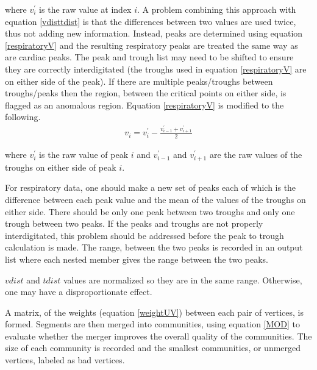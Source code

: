\documentclass[twoside,twocolumn]{article}
\begin{document}
where $v_i^{\prime}$ is the raw value at index $i$.  A problem combining this approach with equation \ref{vdisttdist} is that the differences between two values are used twice, thus not adding new information.  Instead, peaks are determined using equation \ref{respiratoryV} and the resulting respiratory peaks are treated the same way as are cardiac peaks.  The peak and trough list may need to be shifted to ensure they are correctly interdigitated (the troughs used in equation \ref{respiratoryV} are on either side of the peak).  If there are multiple peaks/troughs between troughs/peaks then the region, between the critical points on either side, is flagged as an anomalous region.  Equation \ref{respiratoryV} is modified to the following.
\begin{eqnarray}
	v_i = v_i^{\prime} - \frac{v_{i-1}^{\prime}+v_{i+1}^{\prime}}{2} 
	\label{respiratoryV2}
\end{eqnarray}

where $v_i^{\prime}$ is the raw value of peak $i$ and $v_{i-1}^{\prime}$ and $v_{i+1}^{\prime}$ are the raw values of the troughs on either side of peak $i$.

For respiratory data, one should make a new set of peaks each of which is the difference between each peak value and the mean of the values of the troughs on either side.  There should be only one peak between two troughs and only one trough between two peaks.  If the peaks and troughs are not properly interdigitated, this problem should be addressed before the peak to trough calculation is made.  The range, between the two peaks is recorded in an output list where each nested member gives the range between the two peaks.  

$vdist$ and $tdist$ values are normalized so they are in the same range.  Otherwise, one may have a disproportionate effect.

A matrix, of the weights (equation \ref{weightUV}) between each pair of vertices, is formed.  Segments are then merged into communities, using equation \ref{MOD} to evaluate whether the merger improves the overall quality of the communities.  The size of each community is recorded and the smallest communities, or unmerged vertices, labeled as bad vertices.
\end{document}

